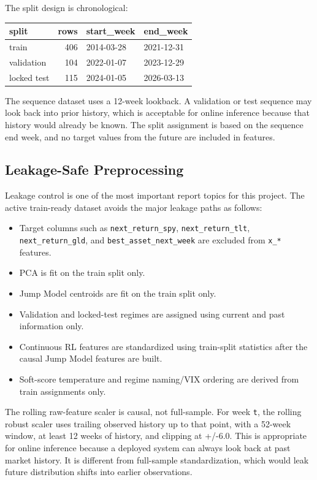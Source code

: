 The split design is chronological:

{\def\LTcaptype{none} %
\begin{longtable}[]{@{}lrll@{}}
\toprule\noalign{}
split & rows & start\_week & end\_week \\
\midrule\noalign{}
\endhead
\bottomrule\noalign{}
\endlastfoot
train & 406 & 2014-03-28 & 2021-12-31 \\
validation & 104 & 2022-01-07 & 2023-12-29 \\
locked test & 115 & 2024-01-05 & 2026-03-13 \\
\end{longtable}
}

The sequence dataset uses a 12-week lookback. A validation or test
sequence may look back into prior history, which is acceptable for
online inference because that history would already be known. The split
assignment is based on the sequence end week, and no target values from
the future are included in features.

\subsection{Leakage-Safe
Preprocessing}\label{leakage-safe-preprocessing}

Leakage control is one of the most important report topics for this
project. The active train-ready dataset avoids the major leakage paths
as follows:

\begin{itemize}
\tightlist
\item
  Target columns such as \texttt{next\_return\_spy},
  \texttt{next\_return\_tlt}, \texttt{next\_return\_gld}, and
  \texttt{best\_asset\_next\_week} are excluded from \texttt{x\_*}
  features.
\item
  PCA is fit on the train split only.
\item
  Jump Model centroids are fit on the train split only.
\item
  Validation and locked-test regimes are assigned using current and past
  information only.
\item
  Continuous RL features are standardized using train-split statistics
  after the causal Jump Model features are built.
\item
  Soft-score temperature and regime naming/VIX ordering are derived from
  train assignments only.
\end{itemize}

The rolling raw-feature scaler is causal, not full-sample. For week
\texttt{t}, the rolling robust scaler uses trailing observed history up
to that point, with a 52-week window, at least 12 weeks of history, and
clipping at +/-6.0. This is appropriate for online inference because a
deployed system can always look back at past market history. It is
different from full-sample standardization, which would leak future
distribution shifts into earlier observations.

